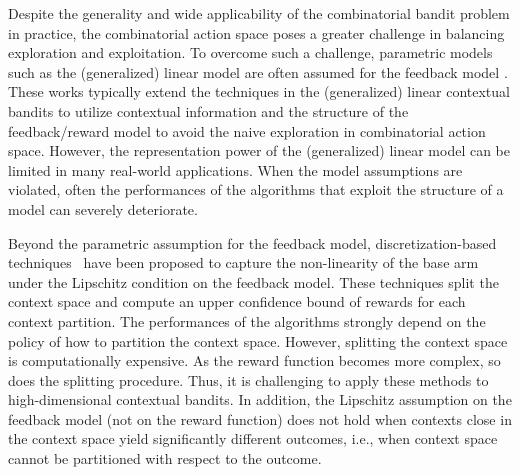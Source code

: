 \documentclass{article}
\theoremstyle{plain}
\begin{document}
Despite the generality and wide applicability of the combinatorial bandit problem in practice, the combinatorial action space
poses a greater challenge in balancing exploration and exploitation. 
To overcome such a challenge, parametric models such as the (generalized) linear model are often assumed for the feedback model \cite{qin2014contextual, wen2015efficient, kveton2015cascading, zong2016cascading, li2016contextual, li2019online, oh2019thompson}. These works typically extend the techniques in the (generalized) linear contextual bandits \cite{abe1999associative, auer2002using, filippi2010parametric, rusmevichientong2010linearly, abbasi2011improved,chu2011contextual, li2017provably} to utilize contextual information  
and the structure of the feedback/reward model to avoid the naive exploration in combinatorial action space. 
However, the representation power of the (generalized) linear model can be limited in many real-world applications. When the model assumptions are violated, often the performances of the algorithms that exploit the structure of a model can severely deteriorate.

%
Beyond the parametric assumption for the feedback model, discretization-based techniques~\cite{chen2018contextual, nika2020contextual} have been proposed to capture the non-linearity of the base arm under the Lipschitz condition on the feedback model. 
These techniques split the context space and compute an upper confidence bound of rewards for each context partition.
The performances of the algorithms strongly depend on the policy of how to partition the context space. 
However, splitting the context space is computationally expensive.
As the reward function becomes more complex, so does the splitting procedure.
Thus, it is challenging to apply these methods to high-dimensional contextual bandits.
In addition, the Lipschitz assumption on the feedback model (not on the reward function) does not hold when contexts close in the context space yield significantly different outcomes, i.e., when context space cannot be partitioned with respect to the outcome.
\end{document}
